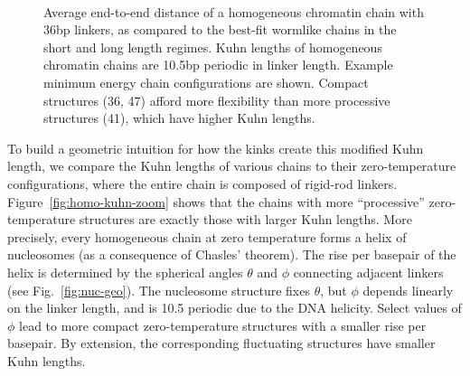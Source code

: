 \documentclass[%
 reprint,
superscriptaddress,
showpacs,preprintnumbers,
 amsmath,amssymb,
 aps,
 prl,
]{revtex4-1}
\begin{document}
\begin{figure}[ht]
    \\
    \caption{\protect{} Average end-to-end distance of a
    homogeneous chromatin chain with 36bp linkers, as compared to the best-fit
    wormlike chains in the short and long length regimes.
    \protect{} Kuhn lengths of homogeneous chromatin
    chains are 10.5bp periodic in linker length. Example minimum energy chain
    configurations are shown. Compact structures (36, \SI{47}{\basepair}) afford
    more flexibility than more processive structures (\SI{41}{\basepair}), which
    have higher Kuhn lengths.}\label{fig:homo-chain}
\end{figure}

To build a geometric intuition for how the kinks create this modified Kuhn
    length, we compare the Kuhn lengths of various chains to their
    zero-temperature configurations, where the entire chain is composed of
    rigid-rod linkers.
Figure~\ref{fig:homo-kuhn-zoom} shows that the chains with more ``processive''
    zero-temperature structures are exactly those with larger Kuhn lengths.
More precisely, every homogeneous chain at zero temperature forms a
    helix of nucleosomes (as a consequence of Chasles' theorem).
The rise per basepair of the helix is determined by the spherical angles
    $\theta$ and $\phi$ connecting adjacent linkers (see Fig.~\ref{fig:nuc-geo}).
The nucleosome structure fixes $\theta$, but $\phi$ depends linearly on the
    linker length, and is \SI{10.5}{\basepair} periodic due to the DNA helicity.
Select values of $\phi$ lead to more compact zero-temperature structures with a
    smaller rise per basepair.
By extension, the corresponding fluctuating structures have smaller Kuhn lengths.
\end{document}
